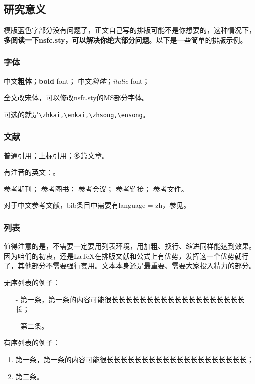 
\subsection{研究意义}
\vspace{-5pt}
模版蓝色字部分没有问题了，正文自己写的排版可能不是你想要的，这种情况下，\textbf{多阅读一下nsfc.sty，可以解决你绝大部分问题}。以下是一些简单的排版示例。
\subsubsection{字体}
中文\textbf{粗体}；\textbf{bold} font；
中文\textit{斜体}；\textit{italic} font；

全文改宋体，可以修改nsfc.sty的MS部分字体。

可选的就是\verb|\zhkai,\enkai,\zhsong,\ensong|。

\subsubsection{文献}
普通引用\cite{test}；上标引用；多篇文章。

有注音的英文：\cite{test}。

参考期刊\cite{test}；
参考图书\cite{test2}；
参考会议\cite{test5}；
参考链接\cite{test4}；
参考文件\cite{test6}。

对于中文参考文献，bib条目中需要有language = {zh}，参见\cite{test2}。
\subsubsection{列表}
值得注意的是，不需要一定要用列表环境，用加粗、换行、缩进同样能达到效果。
因为咱们的初衷，还是LaTeX在排版文献和公式上有优势，发挥这一个优势就行了，其他部分不需要强行套用。文本本身还是最重要、需要大家投入精力的部分。

无序列表的例子：
\begin{itemize}[left= 50pt]
	\item[-] 第一条，第一条的内容可能很长长长长长长长长长长长长长长长长长长长长；
	\item[-] 第二条。
\end{itemize}

有序列表的例子：
\begin{enumerate}[left= 50pt]
	\item 第一条，第一条的内容可能很长长长长长长长长长长长长长长长长长长长长；
	\item 第二条。
\end{enumerate}

